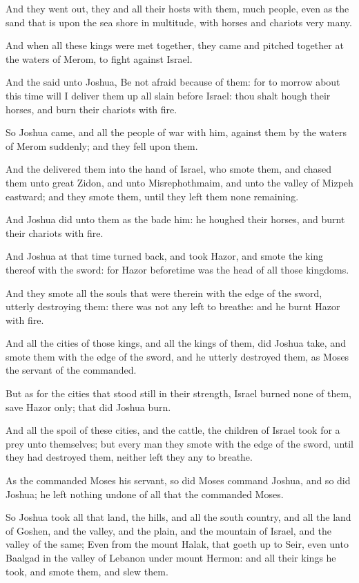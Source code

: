 \Verse And they went out, they and all their hosts with them, much people, even as the sand that is upon the sea shore in multitude, with horses and chariots very many.

\Verse And when all these kings were met together, they came and pitched together at the waters of Merom, to fight against Israel.

\Verse And the \LORD said unto Joshua, Be not afraid because of them: for to morrow about this time will I deliver them up all slain before Israel: thou shalt hough their horses, and burn their chariots with fire.

\Verse So Joshua came, and all the people of war with him, against them by the waters of Merom suddenly; and they fell upon them.

\Verse And the \LORD delivered them into the hand of Israel, who smote them, and chased them unto great Zidon, and unto Misrephothmaim, and unto the valley of Mizpeh eastward; and they smote them, until they left them none remaining.

\Verse And Joshua did unto them as the \LORD bade him: he houghed their horses, and burnt their chariots with fire.

\Verse And Joshua at that time turned back, and took Hazor, and smote the king thereof with the sword: for Hazor beforetime was the head of all those kingdoms.

\Verse And they smote all the souls that were therein with the edge of the sword, utterly destroying them: there was not any left to breathe: and he burnt Hazor with fire.

\Verse And all the cities of those kings, and all the kings of them, did Joshua take, and smote them with the edge of the sword, and he utterly destroyed them, as Moses the servant of the \LORD commanded.

\Verse But as for the cities that stood still in their strength, Israel burned none of them, save Hazor only; that did Joshua burn.

\Verse And all the spoil of these cities, and the cattle, the children of Israel took for a prey unto themselves; but every man they smote with the edge of the sword, until they had destroyed them, neither left they any to breathe.

\Verse As the \LORD commanded Moses his servant, so did Moses command Joshua, and so did Joshua; he left nothing undone of all that the \LORD commanded Moses.

\Verse So Joshua took all that land, the hills, and all the south country, and all the land of Goshen, and the valley, and the plain, and the mountain of Israel, and the valley of the same; \Verse Even from the mount Halak, that goeth up to Seir, even unto Baalgad in the valley of Lebanon under mount Hermon: and all their kings he took, and smote them, and slew them.


